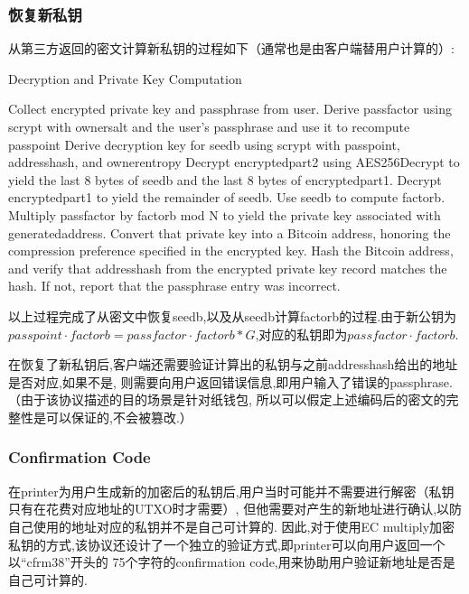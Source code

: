 \subsubsection{恢复新私钥}
从第三方返回的密文计算新私钥的过程如下（通常也是由客户端替用户计算的）:

\begin{algorithm}[tbp]\footnotesize
\caption{Decryption and Private Key Computation}
  	\begin{algorithmic}[1]
	   \STATE  Collect encrypted private key and passphrase from user.
	   \STATE  Derive passfactor using scrypt with ownersalt and the user's 
	   passphrase and use it to recompute passpoint
	   \STATE Derive decryption key for seedb using scrypt with passpoint, 
	   addresshash, and ownerentropy
		\STATE Decrypt encryptedpart2 using AES256Decrypt to yield the last 
		8 bytes of seedb and the last 8 bytes of encryptedpart1.
		\STATE Decrypt encryptedpart1 to yield the remainder of seedb.
		\STATE Use seedb to compute factorb.
		\STATE Multiply passfactor by factorb mod N to yield the private key 
		associated with generatedaddress.
		\STATE C\STATE onvert that private key into a Bitcoin address, honoring 
		the compression preference specified in the encrypted key.
		\STATE Hash the Bitcoin address, and verify that addresshash from the 
		encrypted private key record matches the hash. If not, report that the 
		passphrase entry was incorrect.
    \end{algorithmic}
\end{algorithm}

以上过程完成了从密文中恢复seedb,以及从seedb计算factorb的过程.由于新公钥为$passpoint\cdot 
factorb=passfactor\cdot factorb *G$,对应的私钥即为$passfactor\cdot factorb$.

在恢复了新私钥后,客户端还需要验证计算出的私钥与之前addresshash给出的地址是否对应,如果不是,
则需要向用户返回错误信息,即用户输入了错误的passphrase.（由于该协议描述的目的场景是针对纸钱包,
所以可以假定上述编码后的密文的完整性是可以保证的,不会被篡改.）


\subsubsection{ Confirmation Code}
在printer为用户生成新的加密后的私钥后,用户当时可能并不需要进行解密（私钥只有在花费对应地址的UTXO时才需要）,
但他需要对产生的新地址进行确认,以防自己使用的地址对应的私钥并不是自己可计算的.
因此,对于使用EC multiply加密私钥的方式,该协议还设计了一个独立的验证方式,即printer可以向用户返回一个以“cfrm38”开头的
75个字符的confirmation code,用来协助用户验证新地址是否是自己可计算的.
 
